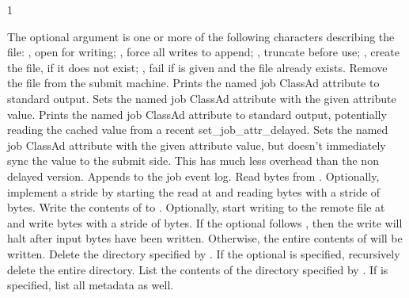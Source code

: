 \begin{ManPage}{\label{man-condor-chirp}}{1}
\begin{description}
{    The optional  argument is one or more of 
    the following characters describing the  file:
      ,  open for writing;
      ,  force all writes to append;
      ,  truncate before use;
      ,  create the file, if it does not exist;
      ,  fail if  is given and the file already exists.
    }
    {Remove the  file from the submit machine.}
    {Prints the named job ClassAd attribute to standard output.}
    {Sets the named job ClassAd attribute with the given attribute value.}
    {Prints the named job ClassAd attribute to standard output, potentially reading the cached value from a recent set\_job\_attr\_delayed.}
    {Sets the named job ClassAd attribute with the given attribute value, but doesn't immediately sync the value to the submit side. This has much less overhead than the non delayed version.}
    {Appends  to the job event log.}
    {Read  bytes from . Optionally,
    implement a stride by
    starting the read at  and reading  bytes
    with a stride of  bytes.}
    {Write the contents of  to .
    Optionally, start writing to the remote file at  and write
     bytes with a stride of  bytes.  If the optional
     follows , then the
    write will halt after  input bytes have been written.
    Otherwise, the entire contents of  will be written.}
    {Delete the directory specified by . 
    If the optional  is specified, 
    recursively delete the entire directory.}
    {List the contents of the directory specified by . 
    If  is specified, list all metadata as well.}

\end{description}
\end{ManPage}
